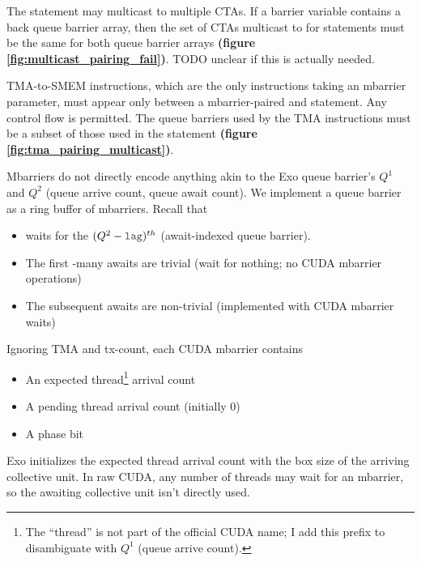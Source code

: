 \filbreak
{}

The  statement may multicast to multiple CTAs.
If a barrier variable contains a back queue barrier array, then the set of CTAs multicast to for  statements must be the same for both queue barrier arrays \textbf{(figure \ref{fig:multicast_pairing_fail})}.
TODO unclear if this is actually needed.

\filbreak
{}

TMA-to-SMEM instructions, which are the only instructions taking an mbarrier parameter, must appear only between a mbarrier-paired  and  statement.
Any control flow is permitted.
The queue barriers used by the TMA instructions must be a subset of those used in the  statement \textbf{(figure \ref{fig:tma_pairing_multicast})}.

\filbreak
{}

Mbarriers do not directly encode anything akin to the Exo queue barrier's $Q^1$ and $Q^2$ (queue arrive count, queue await count).
We implement a queue barrier as a ring buffer of mbarriers.
Recall that
\begin{itemize}
  \item {} waits for the $(Q^2 - \lighttt{lag})^{th}$  (await-indexed queue barrier).
  \filbreak
  \item The first -many awaits are trivial (wait for nothing; no CUDA mbarrier operations)
  \filbreak
  \item The subsequent awaits are non-trivial (implemented with CUDA mbarrier waits)
\end{itemize}
\filbreak
Ignoring TMA and tx-count, each CUDA mbarrier contains
\begin{itemize}
  \item An expected thread\footnote{The ``thread'' is not part of the official CUDA name; I add this prefix to disambiguate with $Q^1$ (queue arrive count).} arrival count
  \filbreak
  \item A pending thread arrival count (initially 0)
  \filbreak
  \item A phase bit
\end{itemize}
Exo initializes the expected thread arrival count with the box size of the arriving collective unit.
In raw CUDA, any number of threads may wait for an mbarrier, so the awaiting collective unit isn't directly used.

